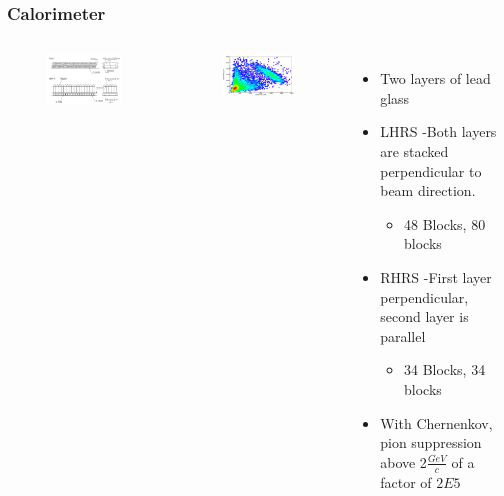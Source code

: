 \documentclass{beamer}
\begin{document}
\begin{frame}
\frametitle{Calorimeter}

\begin{columns}
	\vspace{-10pt}
	\begin{figure}
		\includegraphics[width=6cm]{../images/calo}
	\end{figure}
	\vspace{-10pt}
	\begin{figure}
		\includegraphics[width=6cm]{../images/PR1_2}
	\end{figure}	

	\begin{itemize}
		\item Two layers of lead glass
		\item LHRS -Both layers are stacked perpendicular to beam direction. 
		\begin{itemize}
			\item 48 Blocks, 80 blocks
		\end{itemize}
		\item RHRS -First layer perpendicular, second layer is parallel
		\begin{itemize}
			\item 34 Blocks, 34 blocks
		\end{itemize}
		\item With Chernenkov, pion suppression above 2$\frac{GeV}{c}$ of a factor of $2E5$ \cite{nim}

		
	\end{itemize}
\end{columns}
\end{frame}
\end{document}
